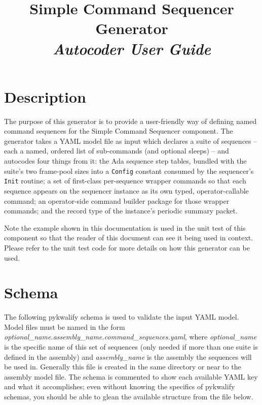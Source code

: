 



\title{\textbf{Simple Command Sequencer Generator} \\
\large\textit{Autocoder User Guide}}
\date{}
\maketitle

\section{Description}

The purpose of this generator is to provide a user-friendly way of defining named command sequences for the Simple Command Sequencer component. The generator takes a YAML model file as input which declares a suite of sequences -- each a named, ordered list of sub-commands (and optional sleeps) -- and autocodes four things from it: the Ada sequence step tables, bundled with the suite's two frame-pool sizes into a \texttt{Config} constant consumed by the sequencer's \texttt{Init} routine; a set of first-class per-sequence wrapper commands so that each sequence appears on the sequencer instance as its own typed, operator-callable command; an operator-side command builder package for those wrapper commands; and the record type of the instance's periodic summary packet.

Note the example shown in this documentation is used in the unit test of this component so that the reader of this document can see it being used in context. Please refer to the unit test code for more details on how this generator can be used.

\section{Schema}

The following pykwalify schema is used to validate the input YAML model. Model files must be named in the form \textit{optional\_name.assembly\_name.command\_sequences.yaml}, where \textit{optional\_name} is the specific name of this set of sequences (only needed if more than one suite is defined in the assembly) and \textit{assembly\_name} is the assembly the sequences will be used in. Generally this file is created in the same directory or near to the assembly model file. The schema is commented to show each available YAML key and what it accomplishes; even without knowing the specifics of pykwalify schemas, you should be able to glean the available structure from the file below.

